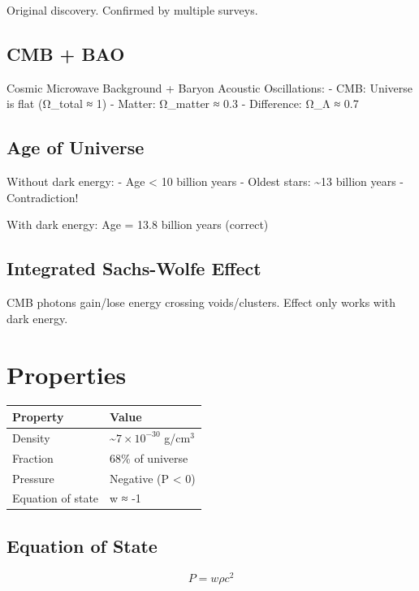 \documentclass[
  11pt,
  letterpaper,
  twoside,
  openright]{book}
\begin{document}
Original discovery. Confirmed by multiple surveys.

\subsection{CMB + BAO}\label{cmb-bao}

Cosmic Microwave Background + Baryon Acoustic Oscillations: - CMB:
Universe is flat (Ω\_total ≈ 1) - Matter: Ω\_matter ≈ 0.3 - Difference:
Ω\_Λ ≈ 0.7

\subsection{Age of Universe}\label{age-of-universe}

Without dark energy: - Age \textless{} 10 billion years - Oldest stars:
\textasciitilde13 billion years - Contradiction!

With dark energy: Age = 13.8 billion years (correct)

\subsection{Integrated Sachs-Wolfe
Effect}\label{integrated-sachs-wolfe-effect}

CMB photons gain/lose energy crossing voids/clusters. Effect only works
with dark energy.

\section{Properties}\label{properties-17}

\begin{longtable}[]{@{}ll@{}}
\toprule\noalign{}
Property & Value \\
\midrule\noalign{}
\endhead
\bottomrule\noalign{}
\endlastfoot
Density & \textasciitilde{}\(7 \times 10^{-30}\) g/cm\(^3\) \\
Fraction & 68\% of universe \\
Pressure & Negative (P \textless{} 0) \\
Equation of state & w ≈ -1 \\
\end{longtable}

\subsection{Equation of State}\label{equation-of-state}

\[
P = w \rho c^2
\]
\end{document}
